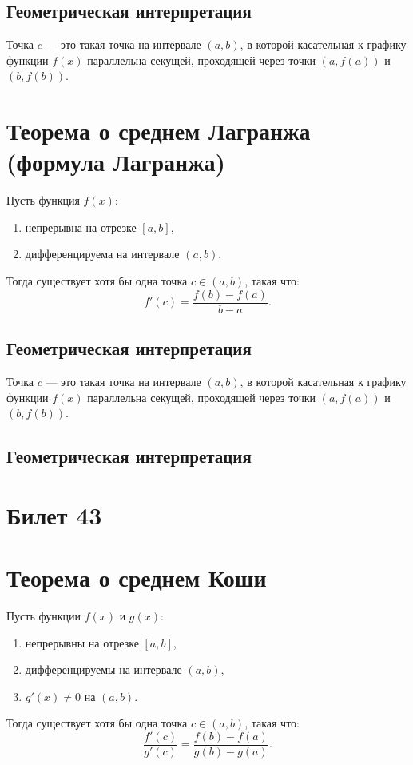 \documentclass{article}
\begin{document}
\subsection*{Геометрическая интерпретация}
Точка \( c \) — это такая точка на интервале \( (a, b) \), в которой касательная к графику функции \( f(x) \) параллельна секущей, проходящей через точки \( (a, f(a)) \) и \( (b, f(b)) \).
\section*{Теорема о среднем Лагранжа (формула Лагранжа)}
Пусть функция \( f(x) \):
\begin{enumerate}
    \item непрерывна на отрезке \( [a, b] \),
    \item дифференцируема на интервале \( (a, b) \).
\end{enumerate}
Тогда существует хотя бы одна точка \( c \in (a, b) \), такая что:
\[
f'(c) = \frac{f(b) - f(a)}{b - a}.
\]

\subsection*{Геометрическая интерпретация}
Точка \( c \) — это такая точка на интервале \( (a, b) \), в которой касательная к графику функции \( f(x) \) параллельна секущей, проходящей через точки \( (a, f(a)) \) и \( (b, f(b)) \).


\subsection{Геометрическая интерпретация}

\section{Билет 43}

\section*{Теорема о среднем Коши}
Пусть функции \( f(x) \) и \( g(x) \):
\begin{enumerate}
    \item непрерывны на отрезке \( [a, b] \),
    \item дифференцируемы на интервале \( (a, b) \),
    \item \( g'(x) \neq 0 \) на \( (a, b) \).
\end{enumerate}
Тогда существует хотя бы одна точка \( c \in (a, b) \), такая что:
\[
\frac{f'(c)}{g'(c)} = \frac{f(b) - f(a)}{g(b) - g(a)}.
\]
\end{document}
